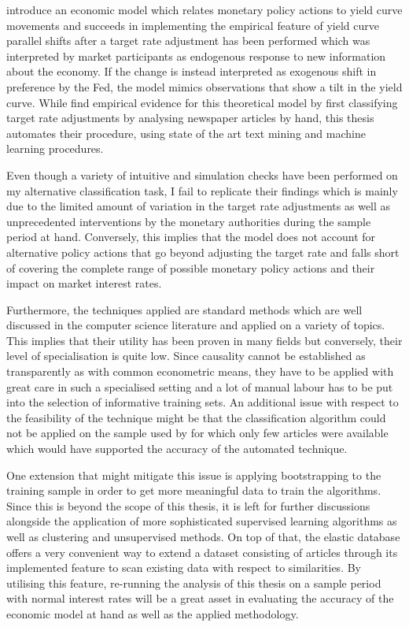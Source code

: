 
\textcite{Ellingsen.2001} introduce an economic model which relates monetary policy actions to yield curve movements and succeeds in implementing the empirical feature of yield curve parallel shifts after a target rate adjustment has been performed which was interpreted by market participants as endogenous response to new information about the economy. If the change is instead interpreted as exogenous shift in preference by the Fed, the model mimics observations that show a tilt in the yield curve. While \textcite{Ellingsen.2003} find empirical evidence for this theoretical model by first classifying target rate adjustments by analysing newspaper articles by hand, this thesis automates their procedure, using state of the art text mining and machine learning procedures. 

Even though a variety of intuitive and simulation checks have been performed on my alternative classification task, I fail to replicate their findings which is mainly due to the limited amount of variation in the target rate adjustments as well as unprecedented interventions by the monetary authorities during the sample period at hand. Conversely, this implies that the model does not account for alternative policy actions that go beyond adjusting the target rate and falls short of covering the complete range of possible monetary policy actions and their impact on market interest rates.

Furthermore, the techniques applied are standard methods which are well discussed in the computer science literature and applied on a variety of topics. This implies that their utility has been proven in many fields but conversely, their level of specialisation is quite low. Since causality cannot be established as transparently as with common econometric means, they have to be applied with great care in such a specialised setting and a lot of manual labour has to be put into the selection of informative training sets. An additional issue with respect to the feasibility of the technique might be that the classification algorithm could not be applied on the sample used by \textcite{Ellingsen.2003} for which only few articles were available which would have supported the accuracy of the automated technique.

One extension that might mitigate this issue is applying bootstrapping to the training sample in order to get more meaningful data to train the algorithms. Since this is beyond the scope of this thesis, it is left for further discussions alongside the application of more sophisticated supervised learning algorithms as well as clustering and unsupervised methods. On top of that, the elastic database \parencite{Elastic.2015} offers a very convenient way to extend a dataset consisting of articles through its implemented feature to scan existing data with respect to similarities. By utilising this feature, re-running the analysis of this thesis on a sample period with normal interest rates will be a great asset in evaluating the accuracy of the economic model at hand as well as the applied methodology.

